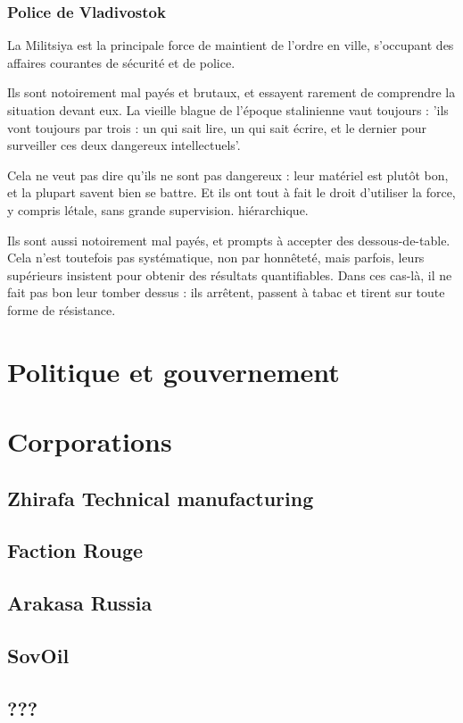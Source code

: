 \documentclass[10pt,a4paper]{book}
\begin{document}
\subsection{Police de Vladivostok}
La Militsiya est la principale force de maintient de l'ordre en ville, s'occupant des affaires courantes de sécurité et de police.

Ils sont notoirement mal payés et brutaux, et essayent rarement de comprendre la situation devant eux. La vieille blague de l'époque stalinienne vaut toujours : 'ils vont toujours par trois : un qui sait lire, un qui sait écrire, et le dernier pour surveiller ces deux dangereux intellectuels'.

Cela ne veut pas dire qu'ils ne sont pas dangereux : leur matériel est plutôt bon, et la plupart savent bien se battre. Et ils ont tout à fait le droit d'utiliser la force, y compris létale, sans grande supervision.
 hiérarchique.
 
Ils sont aussi notoirement mal payés, et prompts à accepter des dessous-de-table. Cela n'est toutefois pas systématique, non par honnêteté, mais parfois, leurs supérieurs insistent pour obtenir des résultats quantifiables. Dans ces cas-là, il ne fait pas bon leur tomber dessus : ils arrêtent, passent à tabac et tirent sur toute forme de résistance.
\chapter{Politique et gouvernement}
\chapter{Corporations}
\section{Zhirafa Technical manufacturing}
\section{Faction Rouge}
\section{Arakasa Russia}
\section{SovOil}
\section{???}
\end{document}
